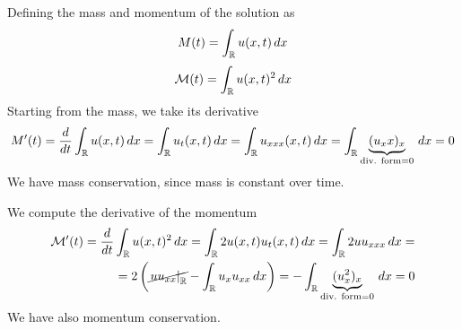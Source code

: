 Defining the mass and momentum of the solution as
\[
    M(t) = \int_{\mathbb{R}} u(x,t) \, dx
\]
\[
    \mathcal{M}(t) = \int_{\mathbb{R}} u(x,t)^2 \, dx
\]
Starting from the mass, we take its derivative
\[
    \begin{split}
        M'(t) = \frac{d}{dt} \int_{\mathbb{R}} u(x,t) \, dx = \int_{\mathbb{R}} u_t(x,t) \, dx = \int_{\mathbb{R}} u_{xxx}(x,t) \, dx = \int_{\mathbb{R}} \underbrace{(u_xx)_x}_{\text{div. form} = 0} \, dx = 0
    \end{split}
\]
We have mass conservation, since mass is constant over time.

We compute the derivative of the momentum
\[
    \begin{split}
        \mathcal{M}'(t) = \frac{d}{dt} \int_{\mathbb{R}} u(x,t)^2 \, dx = \int_{\mathbb{R}} 2 u(x,t) u_t(x,t) \, dx = \int_{\mathbb{R}} 2 u u_{xxx} \, dx = \\
        = 2\left(\cancel{\left. u u_{xx} \right|_{\mathbb{R}}} - \int_{\mathbb{R}} u_x u_{xx} \, dx\right) = - \int_{\mathbb{R}} \underbrace{(u_x^2)_x}_{\text{div. form} = 0} \, dx = 0
    \end{split}
\]
We have also momentum conservation.

